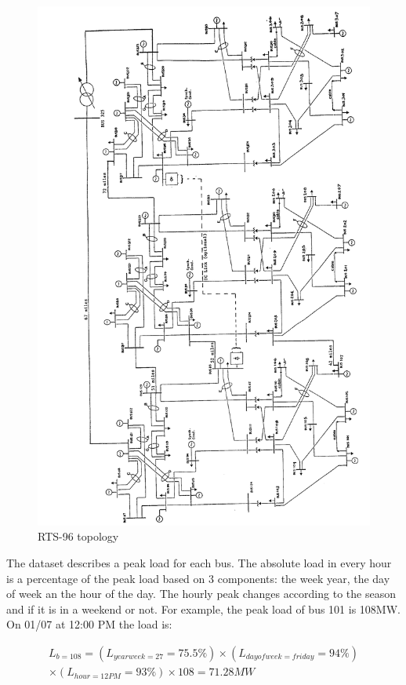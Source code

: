 \documentclass[12pt,LUDisStyle,twosided]{book}
\begin{document}
\begin{figure} 
  \includegraphics[width=\textwidth,height=\textheight,keepaspectratio]{ieeetopology.png}
  \caption{RTS-96 topology \cite{wongieee}}
  \label{fig:ieeetopology}
\end{figure}

The dataset describes a peak load for each bus. The absolute load in every hour is a percentage of the peak load based on 3 components: the week year, the day of week an the hour of the day. The hourly peak changes according to the season and if it is in a weekend or not. For example, the peak load of bus 101 is 108MW. On 01/07 at 12:00 PM the load is:

\begin{multline}
L_{b = 108} =  (L_{yearweek = 27} = 75.5\%) \times (L_{dayofweek = friday} = 94\%) 
\\ \times (L_{hour= 12 PM} = 93\%) \times 108 = 71.28MW
\end{multline}
\end{document}
